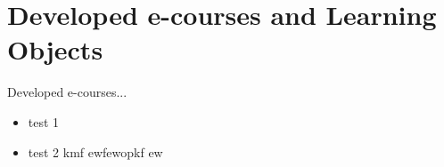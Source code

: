 \section{Developed e-courses and Learning Objects}
\label{Developed e-courses and Learning Objects}
Developed e-courses...
\begin{itemize}
	\item test 1
	\item test 2 kmf ewfewopkf ew
\end{itemize}

